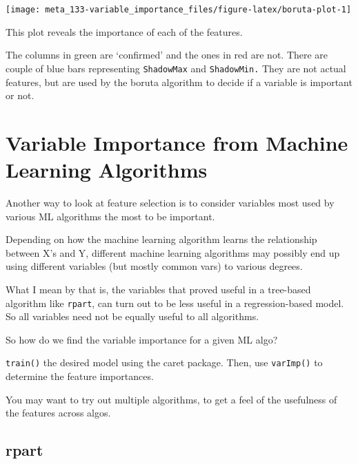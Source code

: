 \documentclass[]{book}
\begin{document}
\begin{center}\texttt{[image: meta\_133-variable\_importance\_files/figure-latex/boruta-plot-1]} \end{center}

This plot reveals the importance of each of the features.

The columns in green are `confirmed' and the ones in red are not. There are couple of blue bars representing \texttt{ShadowMax} and \texttt{ShadowMin.} They are not actual features, but are used by the boruta algorithm to decide if a variable is important or not.

\hypertarget{variable-importance-from-machine-learning-algorithms}{%
\section{Variable Importance from Machine Learning Algorithms}\label{variable-importance-from-machine-learning-algorithms}}

Another way to look at feature selection is to consider variables most used by various ML algorithms the most to be important.

Depending on how the machine learning algorithm learns the relationship between X's and Y, different machine learning algorithms may possibly end up using different variables (but mostly common vars) to various degrees.

What I mean by that is, the variables that proved useful in a tree-based algorithm like \texttt{rpart}, can turn out to be less useful in a regression-based model. So all variables need not be equally useful to all algorithms.

So how do we find the variable importance for a given ML algo?

\texttt{train()} the desired model using the caret package.
Then, use \texttt{varImp()} to determine the feature importances.

You may want to try out multiple algorithms, to get a feel of the usefulness of the features across algos.

\hypertarget{rpart}{%
\subsection{rpart}\label{rpart}}
\end{document}
